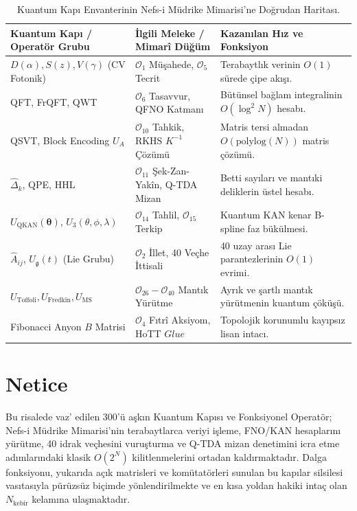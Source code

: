 \documentclass[11pt, a4paper]{article}
\begin{document}
\begin{table}[htbp]
\centering
\small
\begin{tabular}{@{}lll@{}}
\toprule
\textbf{Kuantum Kapı / Operatör Grubu} & \textbf{İlgili Meleke / Mimarî Düğüm} & \textbf{Kazanılan Hız ve Fonksiyon} \\ \midrule
$D(\alpha), S(z), V(\gamma)$ (CV Fotonik) & $\mathcal{O}_1$ Müşahede, $\mathcal{O}_5$ Tecrit & Terabaytlık verinin $O(1)$ sürede çipe akışı. \\
QFT, FrQFT, QWT & $\mathcal{O}_6$ Tasavvur, QFNO Katmanı & Bütünsel bağlam integralinin $O(\log^2 N)$ hesabı. \\
QSVT, Block Encoding $U_A$ & $\mathcal{O}_{10}$ Tahkik, RKHS $K^{-1}$ Çözümü & Matris tersi almadan $O(\text{polylog}(N))$ matris çözümü. \\
$\hat{\Delta}_k$, QPE, HHL & $\mathcal{O}_{11}$ Şek-Zan-Yakîn, Q-TDA Mizan & Betti sayıları ve mantıki deliklerin üstel hesabı. \\
$U_{\text{QKAN}}(\bm{\theta})$, $U_3(\theta,\phi,\lambda)$ & $\mathcal{O}_{14}$ Tahlil, $\mathcal{O}_{15}$ Terkip & Kuantum KAN kenar B-spline faz bükülmesi. \\
$\hat{A}_{ij}$, $U_{\mathfrak{g}}(t)$ (Lie Grubu) & $\mathcal{O}_2$ İllet, 40 Veçhe İttisali & 40 uzay arası Lie parantezlerinin $O(1)$ evrimi. \\
$U_{\text{Toffoli}}, U_{\text{Fredkin}}, U_{\text{MS}}$ & $\mathcal{O}_{26} - \mathcal{O}_{40}$ Mantık Yürütme & Ayrık ve şartlı mantık yürütmenin kuantum çöküşü. \\
Fibonacci Anyon $B$ Matrisi & $\mathcal{O}_4$ Fıtrî Aksiyom, HoTT $Glue$ & Topolojik korunumlu kayıpsız lisan intacı. \\ \bottomrule
\end{tabular}
\caption{Kuantum Kapı Envanterinin Nefs-i Müdrike Mimarisi'ne Doğrudan Haritası.}
\end{table}

\section{Netice}

Bu risalede vaz' edilen 300'ü aşkın Kuantum Kapısı ve Fonksiyonel Operatör; Nefs-i Müdrike Mimarisi'nin terabaytlarca veriyi işleme, FNO/KAN hesaplarını yürütme, 40 idrak veçhesini vuruşturma ve Q-TDA mizan denetimini icra etme adımlarındaki klasik $O(2^N)$ kilitlenmelerini ortadan kaldırmaktadır. Dalga fonksiyonu, yukarıda açık matrisleri ve komütatörleri sunulan bu kapılar silsilesi vasıtasıyla pürüzsüz biçimde yönlendirilmekte ve en kısa yoldan hakiki intaç olan $N_{\text{kebîr}}$ kelamına ulaşmaktadır.
\end{document}
